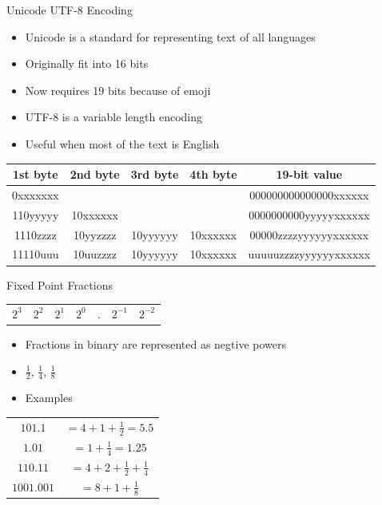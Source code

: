 \begin{withoutheadline}
\begin{frame}[fragile]{Unicode UTF-8 Encoding}
\begin{itemize}
    \item Unicode is a standard for representing text of all languages
    \item Originally fit into 16 bits
    \item Now requires 19 bits because of emoji
    \item UTF-8 is a variable length encoding
    \item Useful when most of the text is English
\end{itemize}
\begin{tabular}{c|c|c|c|c} \toprule
1st byte & 2nd byte & 3rd byte & 4th byte & 19-bit value          \\ \midrule
0xxxxxxx &          &          &          & 000000000000000xxxxxx \\
110yyyyy & 10xxxxxx &          &          & 0000000000yyyyyxxxxxx \\
1110zzzz & 10yyzzzz & 10yyyyyy & 10xxxxxx & 00000zzzzyyyyyyxxxxxx \\
11110uuu & 10uuzzzz & 10yyyyyy & 10xxxxxx & uuuuuzzzzyyyyyyxxxxxx \\ \bottomrule
\end{tabular}
\end{frame}

\begin{frame}[fragile]{Fixed Point Fractions}
\begin{tabular}{c|c|c|c|c|c|c}
$2^3$ & $2^2$ & $2^1$ & $2^0$ & . & $2^{-1}$ & $2^{-2}$ \\       
\end{tabular}

\begin{itemize}
    \item Fractions in binary are represented as negtive powers
    \item $\frac{1}{2}$, $\frac{1}{4}$, $\frac{1}{8}$
    \item Examples
\end{itemize}     
\begin{tabular}{c|c}
$101.1$    & $= 4 + 1 + \frac{1}{2} = 5.5$ \\
$1.01$     & $= 1 + \frac{1}{4} = 1.25$    \\
$110.11$   & $= 4 + 2 + \frac{1}{2} + \frac{1}{4}$ \\
$1001.001$ & $= 8 + 1 + \frac{1}{8}$ \\       
\end{tabular}
\end{frame}


\end{withoutheadline}
